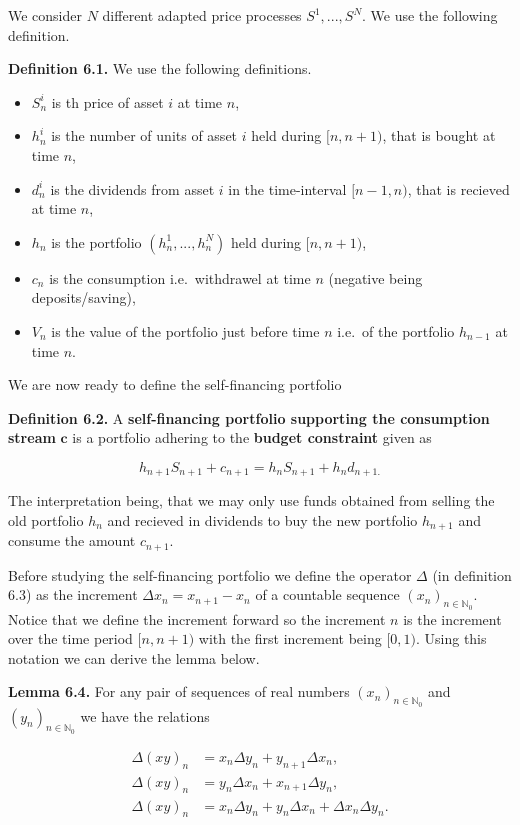 \documentclass[
]{article}
\providecommand{\tightlist}{%
  \setlength{\itemsep}{0pt}\setlength{\parskip}{0pt}}
\begin{document}
We consider \(N\) different adapted price processes \(S^1,...,S^N\). We
use the following definition.

\textbf{Definition 6.1.} We use the following definitions.

\begin{itemize}
\tightlist
\item
  \(S_n^i\) is th price of asset \(i\) at time \(n\),
\item
  \(h_n^i\) is the number of units of asset \(i\) held during
  \([n,n+1)\), that is bought at time \(n\),
\item
  \(d_n^i\) is the dividends from asset \(i\) in the time-interval
  \([n-1,n)\), that is recieved at time \(n\),
\item
  \(h_n\) is the portfolio \((h_n^1,...,h_n^N)\) held during
  \([n,n+1)\),
\item
  \(c_n\) is the consumption i.e.~withdrawel at time \(n\) (negative
  being deposits/saving),
\item
  \(V_n\) is the value of the portfolio just before time \(n\) i.e.~of
  the portfolio \(h_{n-1}\) at time \(n\).
\end{itemize}

We are now ready to define the self-financing portfolio

\textbf{Definition 6.2.} A \textbf{self-financing portfolio supporting
the consumption stream} \(\mathbf{c}\) is a portfolio adhering to the
\textbf{budget constraint} given as

\[
h_{n+1}S_{n+1}+c_{n+1}=h_nS_{n+1}+h_nd_{n+1.}
\]

The interpretation being, that we may only use funds obtained from
selling the old portfolio \(h_n\) and recieved in dividends to buy the
new portfolio \(h_{n+1}\) and consume the amount \(c_{n+1}\).

Before studying the self-financing portfolio we define the operator
\(\Delta\) (in definition 6.3) as the increment
\(\Delta x_n=x_{n+1}-x_n\) of a countable sequence
\((x_n)_{n\in\mathbb{N}_0}\). Notice that we define the increment
forward so the increment \(n\) is the increment over the time period
\([n,n+1)\) with the first increment being \([0,1)\). Using this
notation we can derive the lemma below.

\textbf{Lemma 6.4.} For any pair of sequences of real numbers
\((x_n)_{n\in\mathbb{N}_0}\) and \((y_n)_{n\in\mathbb{N}_0}\) we have
the relations

\begin{align*}
\Delta(xy)_n&=x_n\Delta y_n+y_{n+1}\Delta x_n,\\
\Delta(xy)_n&=y_n\Delta x_n+x_{n+1}\Delta y_n,\\
\Delta(xy)_n&=x_n\Delta y_n+y_n\Delta x_n+\Delta x_n\Delta y_n.
\end{align*}
\end{document}
